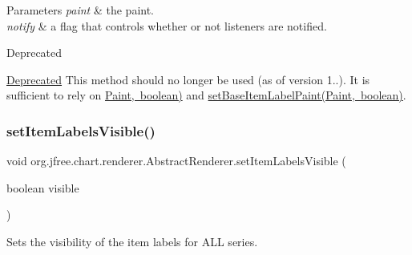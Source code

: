 \begin{DoxyParams}{Parameters}
{\em paint} & the paint. \\
\hline
{\em notify} & a flag that controls whether or not listeners are notified.\\
\hline
\end{DoxyParams}
\begin{DoxyRefDesc}{Deprecated}
\item[\mbox{\hyperlink{deprecated__deprecated000136}{Deprecated}}]This method should no longer be used (as of version 1..). It is sufficient to rely on \mbox{\hyperlink{}{Paint, boolean)}} and \mbox{\hyperlink{classorg_1_1jfree_1_1chart_1_1renderer_1_1_abstract_renderer_a4d1aac1ee560b81daea409e8a28a4038}{set\+Base\+Item\+Label\+Paint(\+Paint, boolean)}}. \end{DoxyRefDesc}
\mbox{\label{classorg_1_1jfree_1_1chart_1_1renderer_1_1_abstract_renderer_abc3441569a05e9f2d2cbdd6744e820a9}} 
\subsubsection{\texorpdfstring{set\+Item\+Labels\+Visible()}{setItemLabelsVisible()}\hspace{0.1cm}{\footnotesize\ttfamily [1/3]}}
{\footnotesize\ttfamily void org.\+jfree.\+chart.\+renderer.\+Abstract\+Renderer.\+set\+Item\+Labels\+Visible (\begin{DoxyParamCaption}\item[{boolean}]{visible }\end{DoxyParamCaption})}

Sets the visibility of the item labels for A\+LL series.


